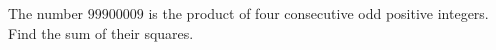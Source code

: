 The number $99900009$ is the product of four consecutive odd positive integers. Find the sum of their squares.
